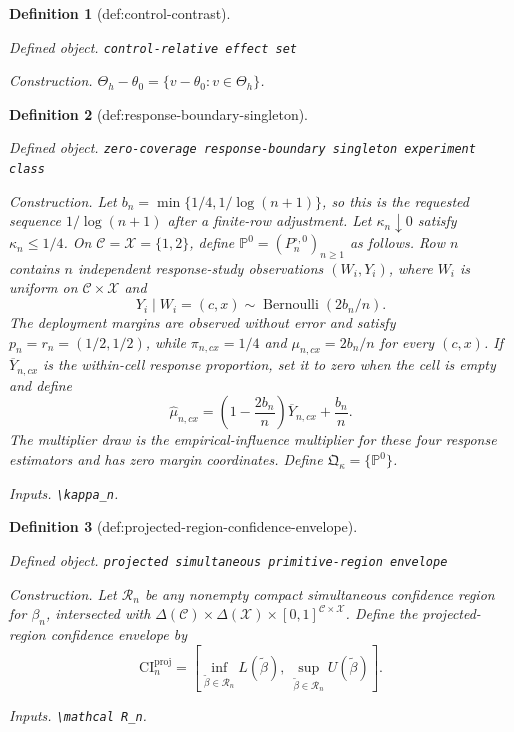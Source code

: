 \documentclass{article}
\newtheorem{definition}{Definition}
\begin{document}
\begin{definition}[def:control-contrast]\label{def:control-contrast}
\par\smallskip\noindent\emph{Defined object.} \texttt{control-\allowbreak{}relative effect set}
\par\smallskip\noindent\emph{Construction.} \(\Theta_h-\theta_0=\{v-\theta_0:v\in\Theta_h\}\).
\end{definition}

\begin{definition}[def:response-boundary-singleton]\label{def:response-boundary-singleton}
\par\smallskip\noindent\emph{Defined object.} \texttt{zero-\allowbreak{}coverage response-\allowbreak{}boundary singleton experiment class}
\par\smallskip\noindent\emph{Construction.} Let \(b_n=\min\{1/4,1/\log(n+1)\}\), so this is the requested sequence \(1/\log(n+1)\) after a finite-row adjustment.  Let \(\kappa_n\downarrow0\) satisfy \(\kappa_n\leq1/4\).  On \(\mathcal C=\mathcal X=\{1,2\}\), define \(\mathbb P^0=(P_n^{\circ,0})_{n\geq1}\) as follows.  Row \(n\) contains \(n\) independent response-study observations \((W_i,Y_i)\), where \(W_i\) is uniform on \(\mathcal C\times\mathcal X\) and
\[
Y_i\mid W_i=(c,x)\sim\operatorname{Bernoulli}(2b_n/n).
\]
The deployment margins are observed without error and satisfy \(p_n=r_n=(1/2,1/2)\), while \(\pi_{n,cx}=1/4\) and \(\mu_{n,cx}=2b_n/n\) for every \((c,x)\).  If \(\overline Y_{n,cx}\) is the within-cell response proportion, set it to zero when the cell is empty and define
\[
\widehat\mu_{n,cx}=\left(1-\frac{2b_n}{n}\right)\overline Y_{n,cx}+\frac{b_n}{n}.
\]
The multiplier draw is the empirical-influence multiplier for these four response estimators and has zero margin coordinates.  Define \(\mathfrak Q_{\kappa}=\{\mathbb P^0\}\).
\par\smallskip\noindent\emph{Inputs.} \texttt{\textbackslash{}\allowbreak{}kappa\_\allowbreak{}n}.
\end{definition}

\begin{definition}[def:projected-region-confidence-envelope]\label{def:projected-region-confidence-envelope}
\par\smallskip\noindent\emph{Defined object.} \texttt{projected simultaneous primitive-\allowbreak{}region envelope}
\par\smallskip\noindent\emph{Construction.} Let \(\mathcal R_n\) be any nonempty compact simultaneous confidence region for \(\beta_n\), intersected with \(\Delta(\mathcal C)\times\Delta(\mathcal X)\times[0,1]^{\mathcal C\times\mathcal X}\).  Define the projected-region confidence envelope by
\[
\mathrm{CI}_n^{\mathrm{proj}}
=\left[
\inf_{\widetilde\beta\in\mathcal R_n}L(\widetilde\beta),
\ \sup_{\widetilde\beta\in\mathcal R_n}U(\widetilde\beta)
\right].
\]
\par\smallskip\noindent\emph{Inputs.} \texttt{\textbackslash{}\allowbreak{}mathcal R\_\allowbreak{}n}.
\end{definition}
\end{document}
